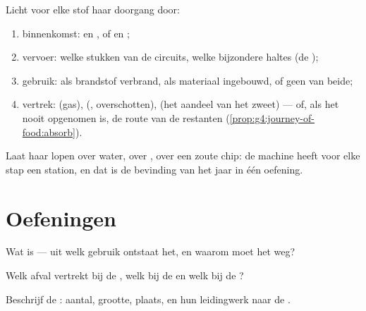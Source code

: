 \begin{method}\label{met:g7:removing-wastes:audit}
Licht voor elke stof haar doorgang door:
\begin{enumerate}
  \item binnenkomst:  en , of  en ;
  \item vervoer: welke stukken van de circuits, welke bijzondere haltes
        (de );
  \item gebruik: als brandstof verbrand, als materiaal ingebouwd, of geen
        van beide;
  \item vertrek:  (gas),  (, overschotten), 
        (het aandeel van het zweet) --- of, als het nooit opgenomen is, de
        route van de restanten
        (\cref{prop:g4:journey-of-food:absorb}).
\end{enumerate}
Laat haar lopen over water, over , over een zoute chip: de machine
heeft voor elke stap een station, en dat is de bevinding van het jaar in
één oefening.
\end{method}

\section{Oefeningen}

\begin{exercise}[$\star$]\label{exo:g7:removing-wastes:1}
Wat is  --- uit welk gebruik ontstaat het, en waarom moet het weg?
\end{exercise}

\begin{exercise}[$\star$]\label{exo:g7:removing-wastes:2}
Welk afval vertrekt bij de , welk bij de  en welk bij de ?
\end{exercise}

\begin{exercise}[$\star$]\label{exo:g7:removing-wastes:3}
Beschrijf de : aantal, grootte, plaats, en hun leidingwerk naar de
.
\end{exercise}

